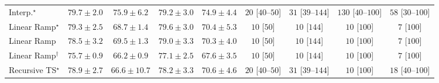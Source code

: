 \begin{tabular}{l|cccc|cccc|}
Interp.$^\star$ & {\cellcolor[HTML]{C64902}} \color[HTML]{F1F1F1} $79.7\pm 2.0$ & {\cellcolor[HTML]{E3660F}} \color[HTML]{F1F1F1} $75.9\pm 6.2$ & {\cellcolor[HTML]{CB4B02}} \color[HTML]{F1F1F1} $79.2\pm 3.0$ & {\cellcolor[HTML]{EA6E13}} \color[HTML]{F1F1F1} $74.9\pm 4.4$ & {\cellcolor[HTML]{FFF4F0}} \color[HTML]{000000} $20$ [$40$--$50$] & {\cellcolor[HTML]{FFF2EE}} \color[HTML]{000000} $31$ [$39$--$144$] & {\cellcolor[HTML]{FDDBD7}} \color[HTML]{000000} $130$ [$40$--$100$] & {\cellcolor[HTML]{FEECE9}} \color[HTML]{000000} $58$ [$30$--$100$] \\
Linear Ramp$^\star$ & {\cellcolor[HTML]{CB4B02}} \color[HTML]{F1F1F1} $79.3\pm 2.5$ & {\cellcolor[HTML]{FEA937}} \color[HTML]{000000} $68.7\pm 1.4$ & {\cellcolor[HTML]{C84A02}} \color[HTML]{F1F1F1} $79.6\pm 3.0$ & {\cellcolor[HTML]{FE9829}} \color[HTML]{000000} $70.4\pm 5.3$ & {\cellcolor[HTML]{FFF7F3}} \color[HTML]{000000} $10$ [$50$] & {\cellcolor[HTML]{FFF7F3}} \color[HTML]{000000} $10$ [$144$] & {\cellcolor[HTML]{FFF7F3}} \color[HTML]{000000} $10$ [$100$] & {\cellcolor[HTML]{FFF7F3}} \color[HTML]{000000} $7$ [$100$] \\
Linear Ramp & {\cellcolor[HTML]{D15205}} \color[HTML]{F1F1F1} $78.5\pm 3.2$ & {\cellcolor[HTML]{FEA030}} \color[HTML]{000000} $69.5\pm 1.3$ & {\cellcolor[HTML]{CD4D03}} \color[HTML]{F1F1F1} $79.0\pm 3.3$ & {\cellcolor[HTML]{FE9829}} \color[HTML]{000000} $70.3\pm 4.0$ & {\cellcolor[HTML]{FFF7F3}} \color[HTML]{000000} $10$ [$50$] & {\cellcolor[HTML]{FFF7F3}} \color[HTML]{000000} $10$ [$144$] & {\cellcolor[HTML]{FFF7F3}} \color[HTML]{000000} $10$ [$100$] & {\cellcolor[HTML]{FFF7F3}} \color[HTML]{000000} $7$ [$100$] \\
Linear Ramp$^\dagger$ & {\cellcolor[HTML]{E56910}} \color[HTML]{F1F1F1} $75.7\pm 0.9$ & {\cellcolor[HTML]{FEC14C}} \color[HTML]{000000} $66.2\pm 0.9$ & {\cellcolor[HTML]{DB5D0B}} \color[HTML]{F1F1F1} $77.1\pm 2.5$ & {\cellcolor[HTML]{FEB340}} \color[HTML]{000000} $67.6\pm 3.5$ & {\cellcolor[HTML]{FFF7F3}} \color[HTML]{000000} $10$ [$50$] & {\cellcolor[HTML]{FFF7F3}} \color[HTML]{000000} $10$ [$144$] & {\cellcolor[HTML]{FFF7F3}} \color[HTML]{000000} $10$ [$100$] & {\cellcolor[HTML]{FFF7F3}} \color[HTML]{000000} $7$ [$100$] \\
Recursive TS$^\star$ & {\cellcolor[HTML]{CE4F03}} \color[HTML]{F1F1F1} $78.9\pm 2.7$ & {\cellcolor[HTML]{FEBD49}} \color[HTML]{000000} $66.6\pm 10.7$ & {\cellcolor[HTML]{D35406}} \color[HTML]{F1F1F1} $78.2\pm 3.3$ & {\cellcolor[HTML]{FD9627}} \color[HTML]{000000} $70.6\pm 4.6$ & {\cellcolor[HTML]{FFF4F0}} \color[HTML]{000000} $20$ [$40$--$50$] & {\cellcolor[HTML]{FFF2EE}} \color[HTML]{000000} $31$ [$39$--$144$] & {\cellcolor[HTML]{FFF7F3}} \color[HTML]{000000} $10$ [$100$] & {\cellcolor[HTML]{FFF5F1}} \color[HTML]{000000} $18$ [$40$--$100$] \\

\end{tabular}
